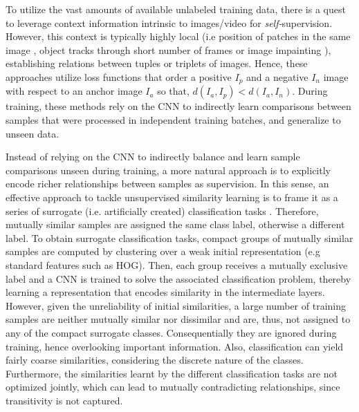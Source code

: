 \documentclass[10pt,twocolumn,letterpaper]{article}
\begin{document}
To utilize the vast amounts of available unlabeled training data, there is a quest to leverage context information intrinsic to images/video for \textit{self-}supervision. However, this context is typically highly local (i.e position of patches in the same image \cite{ConvNetpretext1}, object tracks through short number of frames \cite{ConvNetpretext2} or image impainting \cite{impainting}), establishing relations between tuples \cite{ConvNetpretext1} or triplets \cite{shuffleandlearn,Yang_2016_CVPR,ConvNetpretext2} of images. Hence, these approaches utilize loss functions that order a positive $I_p$ and a negative $I_n$ image with respect to an anchor image $I_a$ so that, $d(I_a,I_p)<d(I_a,I_n)$. During training, these methods rely on the CNN to indirectly learn comparisons between samples that were processed in independent training batches, and generalize to unseen data.


Instead of relying on the CNN to indirectly balance and learn sample comparisons unseen during training, a more natural approach is to explicitly encode richer relationships between samples as supervision. In this sense, an effective approach to tackle unsupervised similarity learning is to frame it as a series of surrogate (i.e. artificially created) classification tasks \cite{exemplarcnn,cliquecnn}. Therefore, mutually similar samples are assigned the same class label, otherwise a different label. To obtain surrogate classification tasks, compact groups of mutually similar samples are computed by clustering \cite{cliquecnn} over a weak initial representation (e.g standard features such as HOG). Then, each group receives a mutually exclusive label and a CNN is trained to solve the associated classification problem, thereby learning a representation that encodes similarity in the intermediate layers. However, given the unreliability of initial similarities, a large number of training samples are neither mutually similar nor dissimilar and are, thus, not assigned to any of the compact surrogate classes. Consequentially they are ignored during training, hence overlooking important information. Also, classification can yield fairly coarse similarities, considering the discrete nature of the classes. Furthermore, the similarities learnt by the different classification tasks are not optimized jointly, which can lead to mutually contradicting relationships, since transitivity is not captured.
\end{document}

